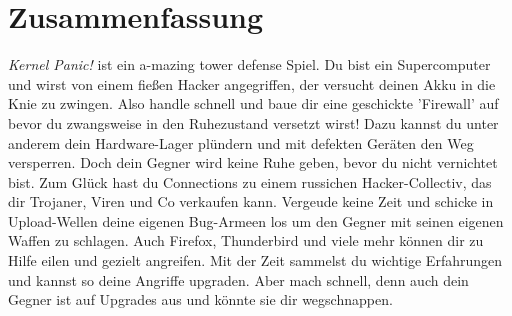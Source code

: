 \section{Zusammenfassung}


\textit{Kernel Panic!} ist ein a-mazing tower defense Spiel.
Du bist ein Supercomputer und wirst von einem fießen Hacker angegriffen, der versucht deinen Akku in die Knie zu zwingen.
Also handle schnell und baue dir eine geschickte 'Firewall' auf bevor du zwangsweise in den Ruhezustand versetzt wirst!
Dazu kannst du unter anderem dein Hardware-Lager plündern und mit defekten Geräten den Weg versperren.
Doch dein Gegner wird keine Ruhe geben, bevor du nicht vernichtet bist.
Zum Glück hast du Connections zu einem russichen Hacker-Collectiv, das dir Trojaner, Viren und Co verkaufen kann. Vergeude keine Zeit und schicke in Upload-Wellen deine eigenen Bug-Armeen los um den Gegner mit seinen eigenen Waffen zu schlagen.
Auch Firefox, Thunderbird und viele mehr können dir zu Hilfe eilen und gezielt angreifen.
Mit der Zeit sammelst du wichtige Erfahrungen und kannst so deine Angriffe upgraden. Aber mach schnell, denn auch dein Gegner ist auf Upgrades aus und könnte sie dir wegschnappen.
